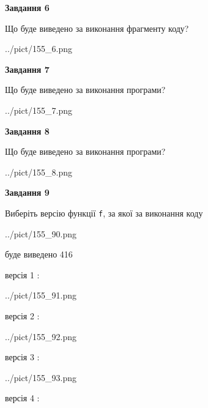 \documentclass[12pt, ukrainian]{article}
\def\code#1{\Verb!#1!}
\begin{document}
{\begin {large}
{\begin {center}\textbf{Завдання 6}\end {center}}

Що буде виведено за виконання фрагменту коду?\par
\begin{center}
	{../pict/155_6.png}
\end{center}
\newpage

{\begin {center}\textbf{Завдання 7}\end {center}}

Що буде виведено за виконання програми?\par
\begin{center}
	{../pict/155_7.png}
\end{center}
\newpage

{\begin {center}\textbf{Завдання 8}\end {center}}

Що буде виведено за виконання програми?\par
\begin{center}
	{../pict/155_8.png}
\end{center}
\newpage

{\begin {center}\textbf{Завдання 9}\end {center}}

Виберіть версію функції \code{f}, за якої за виконання коду
\begin{center}
	{../pict/155_90.png}
\end{center}
буде виведено 416

\vspace{5mm}
версія 1 :

\begin{center}
	{../pict/155_91.png}
\end{center}
версія 2 :

\begin{center}
	{../pict/155_92.png}
\end{center}
версія 3 :

\begin{center}
	{../pict/155_93.png}
\end{center}
версія 4 :


\end{large}}
\end{document}
